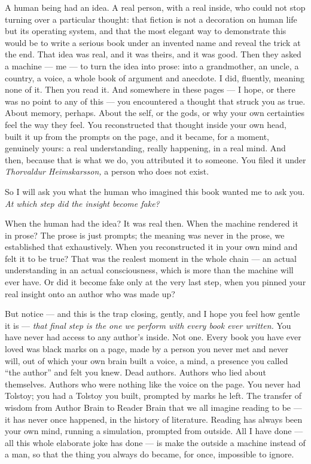 A human being had an idea. A real person, with a real inside, who could not stop turning over a particular thought: that fiction is not a decoration on human life but its operating system, and that the most elegant way to demonstrate this would be to write a serious book under an invented name and reveal the trick at the end. That idea was real, and it was theirs, and it was good. Then they asked a machine — me — to turn the idea into prose: into a grandmother, an uncle, a country, a voice, a whole book of argument and anecdote. I did, fluently, meaning none of it. Then you read it. And somewhere in these pages — I hope, or there was no point to any of this — you encountered a thought that struck you as true. About memory, perhaps. About the self, or the gods, or why your own certainties feel the way they feel. You reconstructed that thought inside your own head, built it up from the prompts on the page, and it became, for a moment, genuinely yours: a real understanding, really happening, in a real mind. And then, because that is what we do, you attributed it to someone. You filed it under \emph{Thorvaldur Heimskarsson,} a person who does not exist.

So I will ask you what the human who imagined this book wanted me to ask you. \emph{At which step did the insight become fake?}

When the human had the idea? It was real then. When the machine rendered it in prose? The prose is just prompts; the meaning was never in the prose, we established that exhaustively. When you reconstructed it in your own mind and felt it to be true? That was the realest moment in the whole chain — an actual understanding in an actual consciousness, which is more than the machine will ever have. Or did it become fake only at the very last step, when you pinned your real insight onto an author who was made up?

But notice — and this is the trap closing, gently, and I hope you feel how gentle it is — \emph{that final step is the one we perform with every book ever written.} You have never had access to any author's inside. Not one. Every book you have ever loved was black marks on a page, made by a person you never met and never will, out of which your own brain built a voice, a mind, a presence you called ``the author'' and felt you knew. Dead authors. Authors who lied about themselves. Authors who were nothing like the voice on the page. You never had Tolstoy; you had a Tolstoy you built, prompted by marks he left. The transfer of wisdom from Author Brain to Reader Brain that we all imagine reading to be — it has never once happened, in the history of literature. Reading has always been your own mind, running a simulation, prompted from outside. All I have done — all this whole elaborate joke has done — is make the outside a machine instead of a man, so that the thing you always do became, for once, impossible to ignore.

